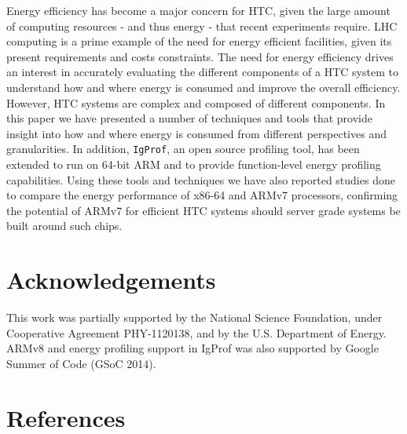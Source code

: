\documentclass[a4paper]{jpconf}
\begin{document}
Energy efficiency has become a major concern for HTC, given the large
amount of computing resources - and thus energy - that recent experiments
require. LHC computing is a prime example of the need for energy
efficient facilities, given its present requirements and costs
constraints. The need for energy efficiency drives an interest
in accurately evaluating the different components of a HTC system
to understand how and where energy is consumed
and improve the overall efficiency. However, HTC systems are complex
and composed of different components. In this paper we have presented
a number of techniques and tools that provide insight into how and
where energy is consumed from different perspectives and granularities.
In addition, \texttt{IgProf}, an open source profiling tool, has been
extended
to run on 64-bit ARM and to provide function-level energy profiling capabilities. 
Using these tools and techniques we have also reported studies done to
compare the energy performance of x86-64 and ARMv7 processors, confirming
the potential of ARMv7 for efficient HTC systems should server grade
systems be built around such chips.


\section*{Acknowledgements}
This work was partially supported by the National Science Foundation,
under Cooperative Agreement PHY-1120138, and by the U.S. Department
of Energy. ARMv8 and energy profiling support in IgProf was also 
supported by Google Summer of Code (GSoC 2014).

\section*{References}



\end{document}
